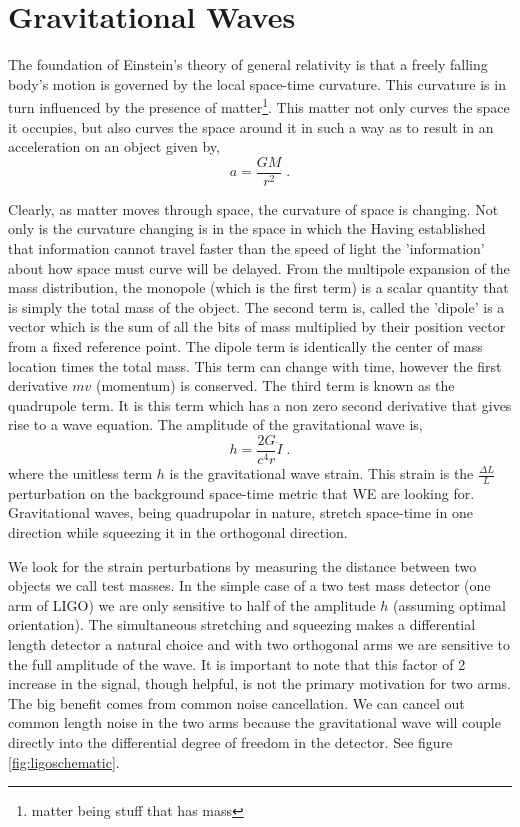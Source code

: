 \acresetall



\section{Gravitational Waves}

The foundation of Einstein's theory of general relativity is that a freely
falling body's motion is governed by the local space-time curvature.
This curvature is in turn influenced by the presence of
matter\footnote{matter being stuff that has mass}.
This matter not only curves the space it occupies, but also curves the space
around it in such a way as to result in an acceleration on an object given by,
\begin{equation}
a = \frac{GM}{r^2} \;.
\end{equation}

Clearly, as matter moves through space, the curvature of space is changing.
Not only is the curvature changing is in the space in which the 
Having established that information cannot travel faster than the speed of light
the 'information' about how space must curve will be delayed.
From the multipole expansion of the mass distribution, the monopole (which is
the first term) is a scalar quantity that is simply the total
mass of the object.
The second term is, called the 'dipole' is a vector which is the sum of all the
bits of mass multiplied by their position vector from a fixed reference point.
The dipole term is identically the center of mass location times the total mass.
This term can change with time, however the first derivative $mv$ (momentum)
is conserved.
The third term is known as the quadrupole term.
It is this term which has a non zero second derivative that gives rise to a
wave equation.
The amplitude of the gravitational wave is,
\begin{equation}
h = \frac{2G}{c^4r}\ddot I \;.
\end{equation}
where the unitless term $h$ is the gravitational wave strain.
This strain is the $\frac{\Delta L}{L}$ perturbation on the background
space-time metric that WE are looking for.
Gravitational waves, being quadrupolar in nature, stretch space-time in one
direction while squeezing it in the orthogonal direction.

We look for the strain perturbations by measuring the distance between two
objects we call test masses.
In the simple case of a two test mass detector (one arm of LIGO) we are only
sensitive to half of the amplitude $h$ (assuming optimal orientation).
The simultaneous stretching and squeezing makes a differential length detector
a natural choice and with two orthogonal arms we are sensitive to the full
amplitude of the wave.
It is important to note that this factor of 2 increase in the signal, though
helpful, is not the primary motivation for two arms. 
The big benefit comes from common noise cancellation.
We can cancel out common length noise in the two arms because the gravitational
wave will couple directly into the differential degree of freedom in the
detector. See figure \ref{fig:ligoschematic}.


